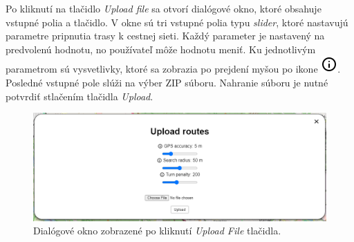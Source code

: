 Po kliknutí na tlačidlo \textit{Upload file} sa otvorí dialógové okno, ktoré obsahuje vstupné polia a tlačidlo. V okne sú tri vstupné polia typu \textit{slider}, ktoré nastavujú parametre pripnutia trasy k cestnej sieti. Každý parameter je nastavený na predvolenú hodnotu, no používateľ môže hodnotu meniť. Ku jednotlivým parametrom sú vysvetlivky, ktoré sa zobrazia po prejdení myšou po ikone \includegraphics[scale=0.5]{img/icons/info.png}. Posledné vstupné pole slúži na výber ZIP súboru. Nahranie súboru je nutné potvrdiť stlačením tlačidla \textit{Upload}.
\begin{figure}[H]
  \centering
  \includegraphics[width=1 \textwidth]{img/tools-panel/upload-dialog.png}
  \caption{Dialógové okno zobrazené po kliknutí \textit{Upload File} tlačidla.}
\end{figure}

